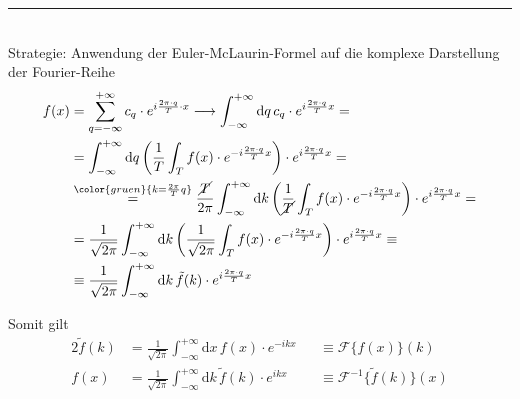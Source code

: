\documentclass{article}
\newcommand{\diff}{\mathrm{d}}
\newcommand{\lr}[1]{\left(#1\right)}
\newcommand{\comment}[1]{{\color{gruen}{#1}}}
\begin{document}
\newpage


{\color{violet}
\hrule
	\\
	Strategie: Anwendung der Euler-McLaurin-Formel auf die komplexe Darstellung der Fourier-Reihe
		\begin{align*}
			f(x) &= \sum_{q=-\infty}^{+\infty} c_q \cdot e^{i\frac{2\pi \cdot q}{T} \cdot x} \longrightarrow \int_{-\infty}^{+\infty} \diff q \, c_q \cdot e^{i \frac{2\pi \cdot q}{T} x} = \\
			&= \int_{-\infty}^{+\infty} \diff q \lr{ \frac{1}{T} \int_T f(x) \cdot e^{-i \frac{2\pi \cdot q}{T} x} } \cdot e^{i \frac{2\pi \cdot q}{T} x} = \\
			&\stackrel{\comment{k = \frac{2\pi}{T} q}}{=} \frac{\cancel{T}}{2\pi} \int_{-\infty}^{+\infty} \diff k \lr{ \frac{1}{\cancel{T}} \int_T f(x) \cdot e^{-i \frac{2\pi \cdot q}{T} x} } \cdot e^{i \frac{2\pi \cdot q}{T} x} = \\
			&= \frac{1}{\sqrt{2\pi}} \int_{-\infty}^{+\infty} \diff k \lr{ \frac{1}{\sqrt{2\pi}} \int_T f(x) \cdot e^{-i \frac{2\pi \cdot q}{T} x} } \cdot e^{i \frac{2\pi \cdot q}{T} x} \equiv \\
			&\equiv \frac{1}{\sqrt{2\pi}} \int_{-\infty}^{+\infty} \diff k \, \tilde{f}(k) \cdot e^{i \frac{2\pi \cdot q}{T} x}
		\end{align*}

	Somit gilt
		\begin{alignat}{2}
		\tilde{f}(k) &= \frac{1}{\sqrt{2\pi}} \int_{-\infty}^{+\infty} \diff x \, f(x) \cdot e^{-i k x} &&\equiv \mathcal{F}\{ f(x) \}(k) \\
		f(x) &= \frac{1}{\sqrt{2\pi}} \int_{-\infty}^{+\infty} \diff k \, \tilde{f}(k) \cdot e^{i k x} &&\equiv \mathcal{F}^{-1}\{ \tilde{f}(k) \}(x)
	\end{alignat}

}
\end{document}

